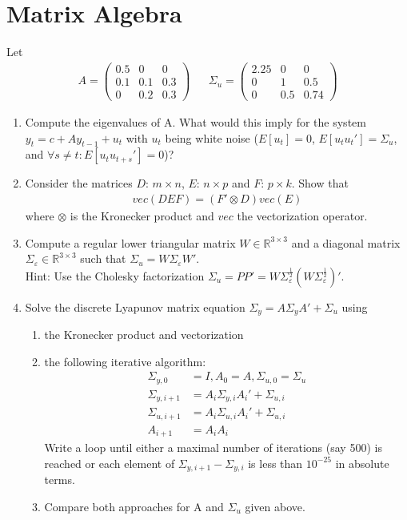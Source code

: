 \section[Matrix Algebra]{Matrix Algebra\label{ex:MatrixAlgebra}}
Let
\begin{align*}
A = \begin{pmatrix}0.5 &0 &0 \\0.1&0.1&0.3\\0&0.2&0.3 \end{pmatrix}
&&
\Sigma_u = \begin{pmatrix}2.25 & 0 & 0\\ 0 & 1 & 0.5\\ 0 & 0.5 & 0.74 \end{pmatrix}
\end{align*}

\begin{enumerate}
\item Compute the eigenvalues of A.
What would this imply for the system $y_t = c + A y_{t-1} + u_t$ with $u_t$ being white noise
  ($E[u_t]=0$, $E[u_t u_t'] = \Sigma_u$, and $\forall s\neq t: E[u_t u_{t+s}'] = 0$)?

\item Consider the matrices $D$: $m\times n$, $E$: $n\times p$ and $F$: $p\times k$.
Show that
\begin{align*}
vec(DEF)=\left(F'\otimes D\right) vec(E)
\end{align*}
where $\otimes$ is the Kronecker product and $vec$ the vectorization operator.

\item Compute a regular lower triangular matrix $W \in \mathbb{R}^{3 \times 3}$ and a diagonal matrix $\Sigma_\varepsilon \in \mathbb{R}^{3 \times 3}$ such that $\Sigma_u=W \Sigma_\varepsilon W'$.
\\
Hint: Use the Cholesky factorization $\Sigma_u = P P' = W \Sigma_\varepsilon^{\frac{1}{2}}(W \Sigma_\varepsilon^{\frac{1}{2}})'$.

\item Solve the discrete Lyapunov matrix equation $\Sigma_{y} = A\Sigma_{y}A' + \Sigma_{u}$ using
 	\begin{enumerate}
	\item the Kronecker product and vectorization
	\item the following iterative algorithm:
	\begin{align*}
	\Sigma_{y,0} &= I, A_0 = A, \Sigma_{u,0} = \Sigma_{u}\\
	\Sigma_{y,i+1} &= A_i \Sigma_{y,i} A_i' + \Sigma_{u,i}\\
	\Sigma_{u,i+1} &= A_i \Sigma_{u,i} A_i' + \Sigma_{u,i}\\
	A_{i+1} &= A_i A_i
	\end{align*}
	Write a loop until either a maximal number of iterations (say 500) is reached or each element of $\Sigma_{y,i+1}-\Sigma_{y,i}$ is less than $10^{-25}$ in absolute terms.
 	\item Compare both approaches for A and $\Sigma_u$ given above.
 	\end{enumerate}
\end{enumerate}

